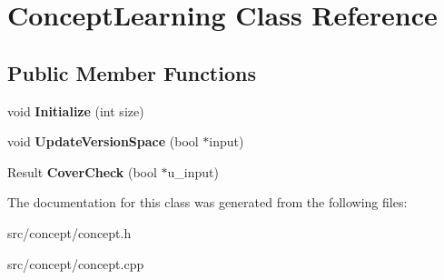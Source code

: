 \hypertarget{classConceptLearning}{\section{Concept\-Learning Class Reference}
\label{classConceptLearning}
}
\subsection*{Public Member Functions}
\begin{DoxyCompactItemize}
\item 
\hypertarget{classConceptLearning_a44745c32a43e09ce1682efdbd29d01f2}{void {\bfseries Initialize} (int size)}\label{classConceptLearning_a44745c32a43e09ce1682efdbd29d01f2}

\item 
\hypertarget{classConceptLearning_adcdb0df6a5e877769e46c95f40a139c3}{void {\bfseries Update\-Version\-Space} (bool $\ast$input)}\label{classConceptLearning_adcdb0df6a5e877769e46c95f40a139c3}

\item 
\hypertarget{classConceptLearning_a2c918ff637b1d93e123974eaddd17de0}{Result {\bfseries Cover\-Check} (bool $\ast$u\-\_\-input)}\label{classConceptLearning_a2c918ff637b1d93e123974eaddd17de0}

\end{DoxyCompactItemize}


The documentation for this class was generated from the following files\-:\begin{DoxyCompactItemize}
\item 
src/concept/concept.\-h\item 
src/concept/concept.\-cpp\end{DoxyCompactItemize}
